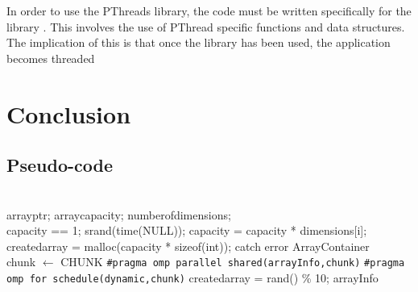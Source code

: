 \documentclass[10pt,twocolumn]{witseiepaper}
\begin{document}
In order to use the PThreads library, the code must be written specifically for the library \cite{pthreadVSopen}. This involves the use of PThread specific functions and data structures. The implication of this is that once the library has been used, the application becomes threaded

\section{Conclusion}




\newpage
\onecolumn

\begin{appendix}
	
\section{Pseudo-code}

	\begin{algorithm}[htbp]
		\begin{algorithmic}
			\\
			\State array\textunderscore ptr;
			\State array\textunderscore capacity;
			\State number\textunderscore of\textunderscore dimensions;
			\\
			
			
			\State capacity == 1;
			\State srand(time(NULL));
			\State capacity = capacity * dimensions[i];
			\EndFor
			\State created\textunderscore array = malloc(capacity * sizeof(int));
			\State catch error
			\EndIf
			\EndFunction
			\State \Return ArrayContainer \\
			
			\State chunk $\leftarrow$ CHUNK
			\State \verb|#pragma omp parallel shared(arrayInfo,chunk)|
			\State \verb|#pragma omp for schedule(dynamic,chunk)|
			\State created\textunderscore array = rand() \% 10;
			\EndFor
			\State \Return arrayInfo \\
			

\end{algorithmic}
\end{algorithm}
\end{appendix}
\end{document}
